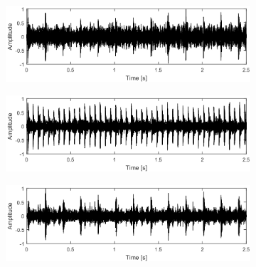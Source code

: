 \begin{figure}[!ht]
    \centering
    \begin{subfigure}[b]{0.49\textwidth}
        \centering
        \captionsetup{skip=0.01pt}
        \caption{}
        \includegraphics[width=\textwidth]{wykresy/chapter_application/semi_blind/sygnal_ff5_simulated.png}
        \label{fig:chapter7/semi_blind/syg_comp5_sim}
    \end{subfigure}
    \vspace{-1\baselineskip}
    \begin{subfigure}[b]{0.49\textwidth}
        \centering
        \captionsetup{skip=0.01pt}
        \caption{}
        \includegraphics[width=\textwidth]{wykresy/chapter_application/semi_blind/sygnal_ff17_simulated.png}
        \label{fig:chapter7/semi_blind/syg_comp17_sim}
    \end{subfigure}
    \vspace{-1\baselineskip}  
    \begin{subfigure}[b]{0.49\textwidth}
        \centering
        \captionsetup{skip=0.01pt}
        \caption{}
        \includegraphics[width=\textwidth]{wykresy/chapter_application/semi_blind/sygnal_simulated_5.png}
        \label{fig:chapter7/semi_blind/ext_comp5_sim}
    \end{subfigure}

\end{figure}
